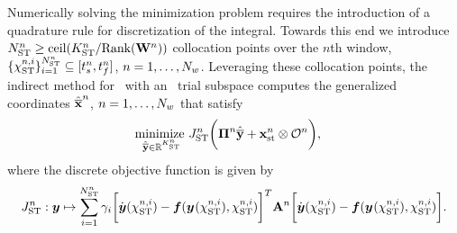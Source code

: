 Numerically solving the minimization problem requires the introduction of a quadrature rule for 
discretization of the integral. Towards this end we introduce $N_{\text{ST}}^{n} \ge \text{ceil}(K_{\text{ST}}^{n}/ \text{Rank}(\mathbf{W}^{n}))$ collocation points over the $n$th window, $ \{ \chi_{\text{ST}}^{n,i} \}_{i=1}^{N_{\text{ST}}^{n}} \subseteq [t_s^{n},t_f^{n}]$, $n=1,\ldots,N_w$. 
Leveraging these collocation points, the indirect method for \methodAcronym\ with an \spaceTimeAcronym\ trial subspace computes the generalized coordinates 
$\hat{\mathbf{\overline{x}}}^{n}$, $n=1,\ldots,N_w$ that satisfy
\begin{equation}\label{eq:obj_gen_slab2} 
\begin{split}
&\underset{\stgenstatey \in \RR{\stdimArg{n}}}{\text{minimize }} \objectiveDiscreteSTArg{n} \bigg( \stbasisArgnt{n} \stgenstatey + \stateInterceptSTArg{n} \otimes \onesFunctionArg{n}  \bigg) , %
\end{split} 
\end{equation}
where the discrete objective function is given by
$$J_{\text{ST}}^{n}: \boldsymbol y \mapsto \sum_{i=1}^{N_{\text{ST}}^{n}} \gamma_i 
\bigg[ \dot{\boldsymbol y}(\chi_{\text{ST}}^{n,i})  - \boldsymbol f (\boldsymbol y^{}(\chi_{\text{ST}}^{n,i}),\chi_{\text{ST}}^{n,i} ) \bigg]^T 
\mathbf{A}^{n} 
\bigg[ \dot{\boldsymbol y}(\chi_{\text{ST}}^{n,i})  - \boldsymbol f (\boldsymbol y^{}(\chi_{\text{ST}}^{n,i}),\chi_{\text{ST}}^{n,i} ) \bigg].
$$
